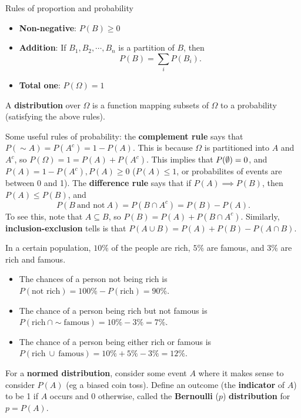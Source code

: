 \begin{namedthing}{Rules of proportion and probability} 
\hspace{0.2em} 

    \begin{itemize}
    \setlength\itemsep{-.2em}
\item \textbf{Non-negative}: $P(B) \geq 0$ 
\item \textbf{Addition}: If $B_1,B_2,\cdots ,B_n $ is a partition of $B$, then \[
        P(B)=\sum _i P(B_i ).
    \] \item \textbf{Total one}: $P(\Omega)=1$
    \end{itemize}
    A \textbf{distribution} over $\Omega$ is a function mapping subsets of $\Omega$ to a probability (satisfying the above rules).    
\end{namedthing}
Some useful rules of probability: the \textbf{complement rule} says that $P(\sim A)=P(A^{c})=1-P(A)$. This is because $\Omega$ is partitioned into $A$ and $A^{c}$, so $P(\Omega)=1=P(A)+P(A^c)$. This implies that $P(\emptyset)=0$, and $P(A)=1-P(A^{c}),P(A) \geq 0$ ($P(A)\leq 1$, or probabilites of events are between 0 and 1). The \textbf{difference rule} says that if $P(A) \implies P(B)$, then $P(A) \leq P(B)$, and \[
    P(B \ \text{and not} \ A)=P(B\cap A^{c})=P(B)-P(A).
\] To see this, note that $A \subseteq B$, so $P(B)=P(A)+P(B \cap A^{c})$. Similarly, \textbf{inclusion-exclusion} tells is that $P(A \cup B)=P(A)+P(B)-P(A \cap B)$.

\begin{example}
In a certain population, $10\%$ of the people are rich, $5\%$ are famous, and $3\%$ are rich and famous.    
\begin{itemize}
\setlength\itemsep{-.2em}
    \item The chances of a person not being rich is $P(\text{not rich} )=100\%-P( \text{rich} )=90\%$.
    \item The chance of a person being rich but not famous is $P(\text{rich} \ \cap \sim \text{famous} )=10\%-3\%=7\%$.
    \item The chance of a person being either rich or famous is $P(\text{rich} \ \cup \ \text{famous} )=10\%+5\%-3\%=12\%$.
\end{itemize}
\end{example}
For a \textbf{normed distribution}, consider some event $A$ where it makes sense to consider $P(A)$ (eg a biased coin toss). Define an outcome (the \textbf{indicator} of $A$) to be 1 if $A$ occurs and 0 otherwise, called the \textbf{Bernoulli} ($p$) \textbf{distribution}  for $p=P(A)$.

